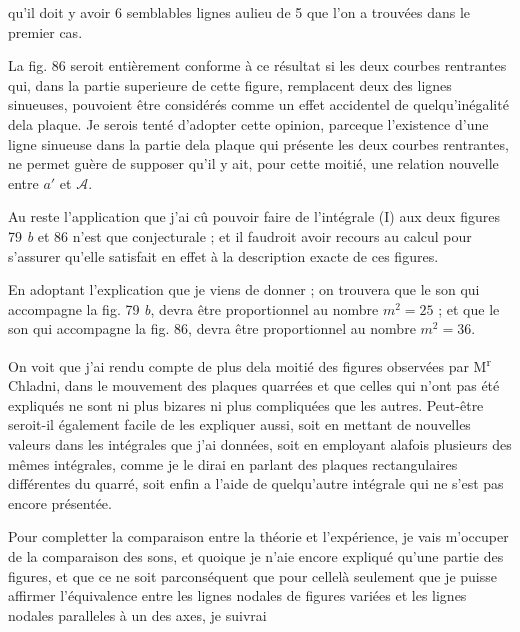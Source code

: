 \documentclass[11pt,a4paper]{article}
\begin{document}
qu'il doit y avoir 6 semblables lignes aulieu de 5 que l'on a trouvées dans le premier cas.

La fig. 86 seroit entièrement conforme à ce résultat si les deux courbes rentrantes qui,
dans la partie superieure de cette figure, remplacent deux des lignes sinueuses,
pouvoient être considérés comme un effet accidentel de quelqu'inégalité dela
plaque. Je serois tenté d'adopter cette opinion, parceque l'existence d'une
ligne sinueuse dans la partie dela plaque qui présente les deux courbes
rentrantes, ne permet guère de supposer qu'il y ait, pour cette moitié, une
relation nouvelle entre $a'$ et $\mathcal{A}$.

Au reste l'application que j'ai cû pouvoir faire de l'intégrale (I)
aux deux figures 79 \emph{b} et 86 n'est que conjecturale ; et il faudroit avoir
recours au calcul pour s'assurer qu'elle satisfait en effet à la description
exacte de ces figures.

En adoptant l'explication que je viens de donner ; on trouvera que le son qui
accompagne la fig. 79 \emph{b}, devra être proportionnel au nombre $m^2=25$ ; et que
le son qui accompagne la fig. 86, devra être proportionnel au nombre $m^2=36$.

On voit que j'ai rendu compte de plus dela moitié des figures observées
par M\textsuperscript{r} Chladni, dans le mouvement des plaques quarrées et que celles
qui n'ont pas été expliqués ne sont ni plus bizares ni plus compliquées
que les autres. Peut-être seroit-il également facile de les expliquer aussi,
soit en mettant de nouvelles valeurs dans les intégrales que j'ai données,
soit en employant alafois plusieurs des mêmes intégrales, comme je le
dirai en parlant des plaques rectangulaires différentes du quarré, soit enfin
a l'aide de quelqu'autre intégrale qui ne s'est pas encore présentée.

Pour completter la comparaison entre la théorie et l'expérience, je vais
m'occuper de la comparaison des sons, et quoique je n'aie encore expliqué
qu'une partie des figures, et que ce ne soit parconséquent que pour cellelà
seulement que je puisse affirmer l'équivalence entre les lignes nodales de
figures variées et les lignes nodales paralleles à un des axes, je suivrai

\end{document}
